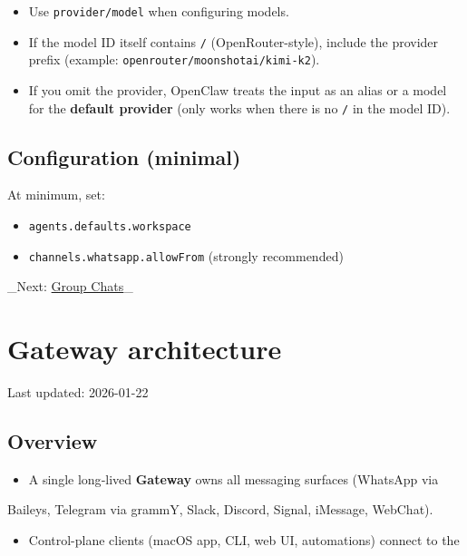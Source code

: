 \begin{itemize}
  \item Use \texttt{provider/model} when configuring models.
  \item If the model ID itself contains \texttt{/} (OpenRouter-style), include the provider prefix (example: \texttt{openrouter/moonshotai/kimi-k2}).
  \item If you omit the provider, OpenClaw treats the input as an alias or a model for the \textbf{default provider} (only works when there is no \texttt{/} in the model ID).
\end{itemize}


\subsection{Configuration (minimal)}


At minimum, set:

\begin{itemize}
  \item \texttt{agents.defaults.workspace}
  \item \texttt{channels.whatsapp.allowFrom} (strongly recommended)
\end{itemize}


\hrulefill


\_Next: \href{/channels/group-messages}{Group Chats}\_ 🦞


\clearpage

\section{Gateway architecture}


Last updated: 2026-01-22

\subsection{Overview}


\begin{itemize}
  \item A single long‑lived \textbf{Gateway} owns all messaging surfaces (WhatsApp via
\end{itemize}

Baileys, Telegram via grammY, Slack, Discord, Signal, iMessage, WebChat).
\begin{itemize}
  \item Control-plane clients (macOS app, CLI, web UI, automations) connect to the
\end{itemize}

